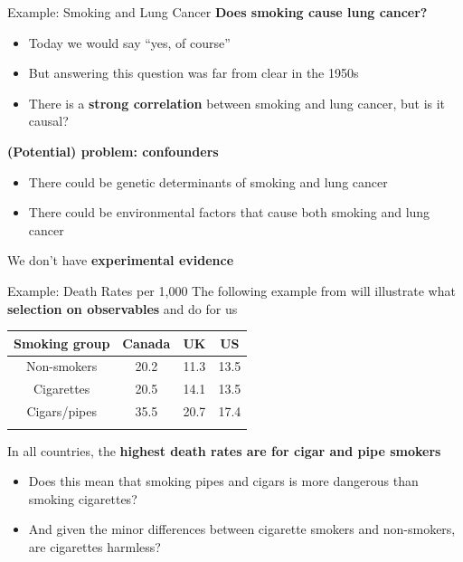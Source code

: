 \documentclass[
  ignorenonframetext,
  aspectratio=169, handout]{beamer}
\providecommand{\tightlist}{%
  \setlength{\itemsep}{0pt}\setlength{\parskip}{0pt}}
\newcommand{\brf}[1]{\textcolor{brickred}{\textbf{#1}}}
\begin{document}
\begin{frame}{Example: Smoking and Lung Cancer}
\protect\hypertarget{example-smoking-and-lung-cancer}{}
\brf{Does smoking cause lung cancer?}

\begin{itemize}
\tightlist
\item
  Today we would say ``yes, of course''
\item
  But answering this question was far from clear in the 1950s
\item
  There is a \textbf{strong correlation} between smoking and lung
  cancer, but is it causal?
\end{itemize}

\vfill
\brf{(Potential) problem: confounders}

\begin{itemize}
\tightlist
\item
  There could be genetic determinants of smoking and lung cancer
\item
  There could be environmental factors that cause both smoking and lung
  cancer
\end{itemize}

\vfill

We don't have \brf{experimental evidence}
\end{frame}

\begin{frame}{Example: Death Rates per 1,000}
\protect\hypertarget{example-death-rates-per-1000}{}
The following example from \citet{cochran1968} will illustrate what
\brf{selection on observables} and do for us

\begin{longtable}[]{@{}cccc@{}}
\toprule\noalign{}
Smoking group & Canada & UK & US \\
\midrule\noalign{}
\endhead
Non-smokers & 20.2 & 11.3 & 13.5 \\
Cigarettes & 20.5 & 14.1 & 13.5 \\
Cigars/pipes & 35.5 & 20.7 & 17.4 \\
\bottomrule\noalign{}
\end{longtable}

\vfill

In all countries, the \textbf{highest death rates are for cigar and pipe
smokers}

\begin{itemize}
\tightlist
\item
  Does this mean that smoking pipes and cigars is more dangerous than
  smoking cigarettes?
\item
  And given the minor differences between cigarette smokers and
  non-smokers, are cigarettes harmless?
\end{itemize}
\end{frame}
\end{document}
